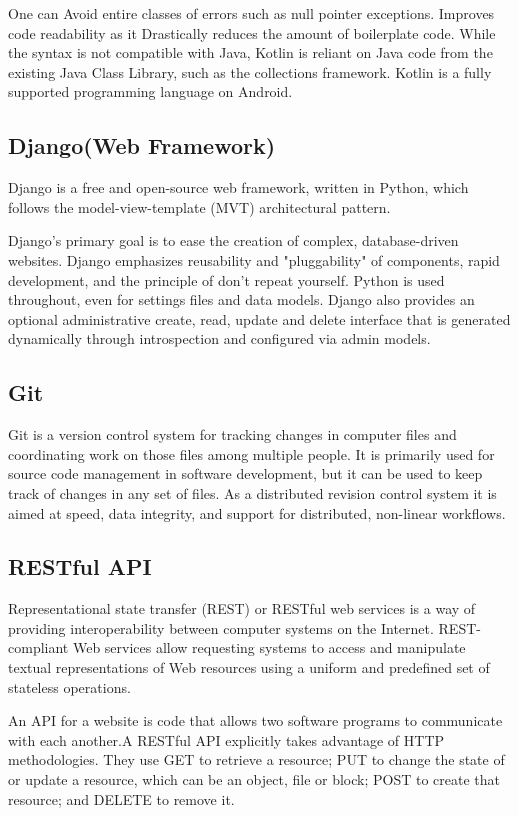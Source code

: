 \documentclass[BTech]{srmuthesis}
\begin{document}
One can Avoid entire classes of errors such as null pointer exceptions. Improves code readability as it Drastically reduces the amount of boilerplate code. While the syntax is not compatible with Java, Kotlin is reliant on Java code from the existing Java Class Library, such as the collections framework. 
Kotlin is a fully supported programming language on Android.
\subsection{Django(Web Framework)}
Django is a free and open-source web framework, written in Python, which follows the model-view-template (MVT) architectural pattern.

Django's primary goal is to ease the creation of complex, database-driven websites. Django emphasizes reusability and "pluggability" of components, rapid development, and the principle of don't repeat yourself. Python is used throughout, even for settings files and data models. Django also provides an optional administrative create, read, update and delete interface that is generated dynamically through introspection and configured via admin models.
\subsection{Git}
Git is a version control system for tracking changes in computer files and coordinating work on those files among multiple people. It is primarily used for source code management in software development, but it can be used to keep track of changes in any set of files. As a distributed revision control system it is aimed at speed, data integrity, and support for distributed, non-linear workflows.
\subsection{RESTful API}
Representational state transfer (REST) or RESTful web services is a way of providing interoperability between computer systems on the Internet. REST-compliant Web services allow requesting systems to access and manipulate textual representations of Web resources using a uniform and predefined set of stateless operations.

An API for a website is code that allows two software programs to communicate with each another.A RESTful API explicitly takes advantage of HTTP methodologies. They use GET to retrieve a resource; PUT to change the state of or update a resource, which can be an object, file or block; POST to create that resource; and DELETE to remove it.
\end{document}

